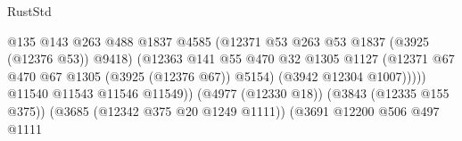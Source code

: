 \begin{lexlean}{RustStd}
\begin{coremodule}
                                                          @135
                                                          @143
                                                          @263
                                                          @488
                                                          @1837
                                                          @4585
                                                          (@12371
                                                            @53
                                                            @263
                                                            @53
                                                            @1837
                                                            (@3925 (@12376 @53))
                                                            @9418)
                                                          (@12363
                                                            @141
                                                            @55
                                                            @470
                                                            @32
                                                            @1305
                                                            @1127
                                                            (@12371
                                                              @67
                                                              @470
                                                              @67
                                                              @1305
                                                              (@3925 (@12376 @67))
                                                              @5154)
                                                            (@3942 @12304 @1007)))))
                                                    @11540
                                                    @11543
                                                    @11546
                                                    @11549))
                                                (@4977 (@12330 @18))
                                                (@3843 (@12335 @155 @375))
                                                (@3685 (@12342 @375 @20 @1249 @1111))
                                                (@3691
                                                  @12200
                                                  @506
                                                  @497
                                                  @1111

\end{coremodule}
\end{lexlean}
